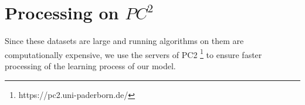 \section{Processing on $PC^2$}
\label{sec:processing_on_pc2}


Since these datasets are large and running algorithms on them are computationally expensive, we use the servers of \ac{PC2} \footnote{https://pc2.uni-paderborn.de/} to ensure faster processing of the learning process of our model.
